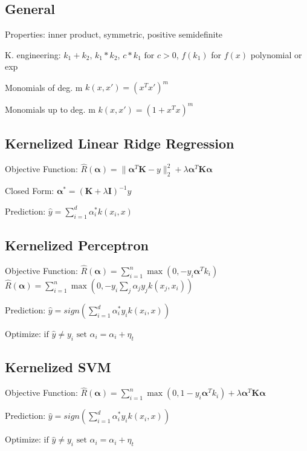 \documentclass[a4paper, 11pt, landscape]{article}
\begin{document}
\begin{multicols*}{3}
		\subsection{General}
		\begin{compactdesc}
			\item[Properties:] inner product, symmetric, positive semidefinite
			\item[K. engineering:] $k_1 + k_2$, $k_1 * k_2$, $c * k_1 \text{ for } c > 0$, $f(k_1)$ for $f(x)$ polynomial or exp
			\item[Monomials of deg. m] $k(x, x') = (x^Tx')^m$
			\item[Monomials up to deg. m] $k(x, x') = (1 + x^Tx)^m$
		\end{compactdesc}
		\subsection{Kernelized Linear Ridge Regression}
		\begin{compactdesc}
			\item[Objective Function:] $\hat{R}(\mathbf{\alpha}) = \|\mathbf{\alpha}^T\mathbf{K} - y\|_2^2 + \lambda \mathbf{\alpha}^T\mathbf{K}\mathbf{\alpha}$
			\item[Closed Form:] $\mathbf{\alpha^*} = (\mathbf{K} + \lambda\mathbf{I})^{-1}y$
			\item[Prediction:] $\hat{y} = \sum_{i=1}^{d}\alpha^*_ik(x_i, x)$
		\end{compactdesc}
		\subsection{Kernelized Perceptron}
		\begin{compactdesc}
			\item[Objective Function:] $\hat{R}(\mathbf{\alpha}) = \sum_{i=1}^{n}\max(0, - y_i \mathbf{\alpha}^Tk_i)$\\
			$\hat{R}(\mathbf{\alpha}) = \sum_{i=1}^{n}\max(0, - y_i\sum_{j}\alpha_jy_jk(x_j, x_i))$\\
			\item[Prediction:] $\hat{y} = sign(\sum_{i=1}^{d}\alpha^*_iy_ik(x_i, x))$
			\item[Optimize:] $\text{if } \hat{y} \neq y_i \text{ set } \alpha_i = \alpha_i + \eta_t$
		\end{compactdesc}
		\subsection{Kernelized SVM}
		\begin{compactdesc}
			\item[Objective Function:] $\hat{R}(\mathbf{\alpha}) = \sum_{i=1}^{n}\max(0, 1- y_i \mathbf{\alpha}^Tk_i) + \lambda\mathbf{\alpha}^T\mathbf{K}\mathbf{\alpha}$
			\item[Prediction:] $\hat{y} = sign(\sum_{i=1}^{d}\alpha^*_iy_ik(x_i, x))$
			\item[Optimize:] $\text{if } \hat{y} \neq y_i \text{ set } \alpha_i = \alpha_i + \eta_t$
		\end{compactdesc}
		

\end{multicols*}
\end{document}
